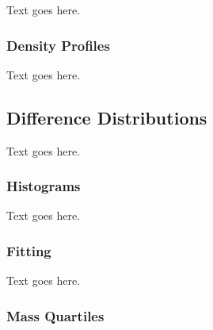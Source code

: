 Text goes here.



\subsubsection{Density Profiles}
\label{subsubsec:analysis--halo_comparison--density_profiles}


Text goes here.




\subsection{Difference Distributions}
\label{subsec:analysis--difference_histograms}


Text goes here.



\subsubsection{Histograms}
\label{subsubsec:analysis--difference_histograms--binning}


Text goes here.



\subsubsection{Fitting}
\label{subsubsec:analysis--difference_histograms--fitting}


Text goes here.



\subsubsection{Mass Quartiles}
\label{subsubsec:analysis--difference_histograms--mass_quartiles}


